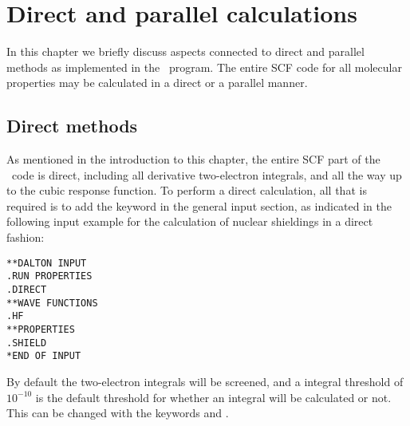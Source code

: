 \chapter{Direct and parallel calculations}\label{ch:dirpar}

In this chapter we briefly discuss aspects connected to
direct and parallel
methods as implemented in the \siraba\ program. The entire 
SCF code for all molecular properties may be calculated in a direct or
a parallel manner.

\section{Direct methods}\label{sec:direct}

\begin{center}
\end{center}

As mentioned in the introduction to this chapter, the entire SCF part
of the \siraba\ code is direct, including all derivative two-electron
integrals, and all the way up to the cubic response function. To
perform a direct calculation, all that is
required is to add the 
keyword  in the general input section, as indicated in the
following input example for the calculation of nuclear
shieldings in a
direct fashion:

\begin{verbatim}
**DALTON INPUT
.RUN PROPERTIES
.DIRECT
**WAVE FUNCTIONS
.HF
**PROPERTIES
.SHIELD
*END OF INPUT
\end{verbatim}

By default the two-electron integrals will be screened, and a integral
threshold of $10^{-10}$ is the default threshold for whether an
integral will be calculated or not. This can be changed with the
keywords  and .

